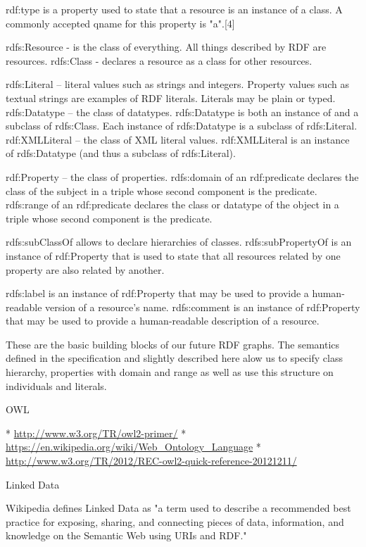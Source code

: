     rdf:type is a property used to state that a resource is an instance of a class. A commonly accepted qname for this property is "a".[4]

    rdfs:Resource - is the class of everything. All things described by RDF are resources.
    rdfs:Class    - declares a resource as a class for other resources.

    rdfs:Literal  – literal values such as strings and integers. Property values such as textual strings are examples of RDF literals. Literals may be plain or typed.
    rdfs:Datatype – the class of datatypes. rdfs:Datatype is both an instance of and a subclass of rdfs:Class. Each instance of rdfs:Datatype is a subclass of rdfs:Literal.
    rdf:XMLLiteral – the class of XML literal values. rdf:XMLLiteral is an instance of rdfs:Datatype (and thus a subclass of rdfs:Literal).

    rdf:Property – the class of properties.
    rdfs:domain of an rdf:predicate declares the class of the subject in a triple whose second component is the predicate.
    rdfs:range of an rdf:predicate declares the class or datatype of the object in a triple whose second component is the predicate.

    rdfs:subClassOf allows to declare hierarchies of classes.
    rdfs:subPropertyOf is an instance of rdf:Property that is used to state that all resources related by one property are also related by another.

    rdfs:label is an instance of rdf:Property that may be used to provide a human-readable version of a resource's name.
    rdfs:comment is an instance of rdf:Property that may be used to provide a human-readable description of a resource.

These are the basic building blocks of our future RDF graphs. The semantics
defined in the specification and slightly described here alow us to specify
class hierarchy, properties with domain and range as well as use this structure
on individuals and literals.  

\sec OWL

\begitems
 * \url{http://www.w3.org/TR/owl2-primer/}
 * \url{https://en.wikipedia.org/wiki/Web_Ontology_Language}
 * \url{http://www.w3.org/TR/2012/REC-owl2-quick-reference-20121211/}
\enditems


\sec Linked Data

Wikipedia defines Linked Data as "a term used to describe a recommended best
practice for exposing, sharing, and connecting pieces of data, information, and
knowledge on the Semantic Web using URIs and RDF."

